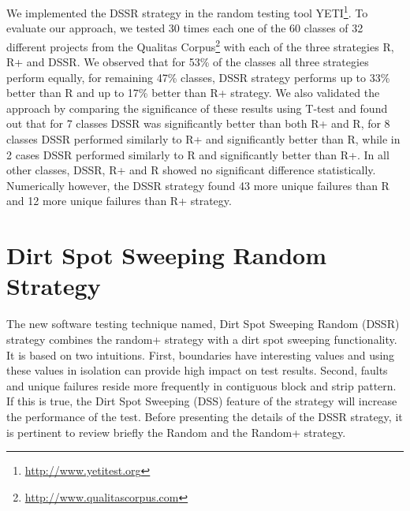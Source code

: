 

We implemented the DSSR strategy in the random testing tool YETI\footnote{\url{http://www.yetitest.org}}. To evaluate our approach, we tested 30 times each one of the 60 classes of 32 different projects from the Qualitas Corpus\footnote{\url{http://www.qualitascorpus.com}} with each of the three strategies R, R+ and DSSR. We observed that for 53\% of the classes all three strategies perform equally, for remaining 47\% classes, DSSR strategy performs up to 33\% better than R and up to 17\% better than R+ strategy.
We also validated the approach by comparing the significance of these results using T-test and found out that for 7 classes DSSR was significantly better than both R+ and R, for 8 classes DSSR performed similarly to R+ and significantly better than R, while in 2 cases DSSR performed similarly to R and significantly better than R+. In all other classes, DSSR, R+ and R showed no significant difference statistically. Numerically however, the DSSR strategy found 43 more unique failures than R and 12 more unique failures than R+ strategy. 






\section{Dirt Spot Sweeping Random Strategy}\label{sec:dssr}
The new software testing technique named, Dirt Spot Sweeping Random (DSSR) strategy combines the random+ strategy with a dirt spot sweeping functionality. It is based on two intuitions. First, boundaries have interesting values and using these values in isolation can provide high impact on test results. Second, faults and unique failures reside more frequently in contiguous block and strip pattern. If this is true, the Dirt Spot Sweeping (DSS) feature of the strategy will increase the performance of the test. Before presenting the details of the DSSR strategy, it is pertinent to review briefly the Random and the Random+ strategy.

